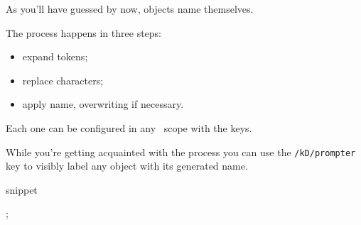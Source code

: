 As you'll have guessed by now, objects name themselves.

The process happens in three steps:
\begin{itemize}[nosep]
  \item expand tokens;
  \item replace characters;
  \item apply name, overwriting if necessary.
\end{itemize}

Each one can be configured in any \koDi\ scope with the keys.

While you're getting acquainted with the process
you can use the \lstinline|/kD/prompter| key to visibly
label any object with its generated name.

\begin{tcblisting}{snippet}
\begin{kodi}[prompter]
  ;
\end{kodi}
\end{tcblisting}
